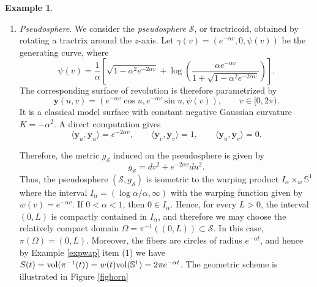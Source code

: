 \documentclass{amsart}
\theoremstyle{definition}
\newtheorem{example}[theorem]{Example}
\theoremstyle{remark}
\numberwithin{equation}{section}
\begin{document}
\begin{example}
\begin{enumerate}
\begin{equation*}\label{boundedspec}
 \begin{aligned}
  \sum_{k=1}^{\infty}\frac{1}{\lambda_k^{\mathcal{D}}(\mathcal{C})} =& \left( \int_{-L}^L\frac{dt}{S(t)} \right)^{-1} \int_{-L}^L 
 S(x)\left(\int_{-L}^x\frac{dt}{S(t)}\int_x^L\frac{dt}{S(t)}\right)dx \\
 =& a^2 \left[ \frac{1}{3}\theta^2(L) +\frac{1}{4}\cosh{\left( 2 \theta(L) \right)} -\frac{1}{8\theta(L)}\sinh{\left( 2\theta(L) \right)}  \right].
 \end{aligned}
\end{equation*}
   

\item \emph{Pseudosphere}. We consider the \emph{pseudosphere} $\mathcal{S}$, or tractricoid, obtained by rotating a
tractrix around the $z$-axis. Let $\gamma(v) = \left( e^{-\alpha v},0,\psi(v) \right)$ be the generating curve, where
\[
\psi(v) = \frac{1}{\alpha} \left[ \sqrt{ 1- \alpha^2 e^{-2\alpha v}}
+ \log \left( \frac{\alpha e^{-\alpha v}}{1+\sqrt{1-\alpha^2 e^{-2\alpha v}}}\right) \right].
\]
The corresponding surface of revolution is therefore parametrized by
\[
\mathbf{y}(u,v)
= \left( e^{-\alpha v}\cos u, e^{-\alpha v}\sin u, \psi(v) \right),
\qquad v\in[0,2\pi).
\]
It is a classical model surface with constant negative Gaussian curvature  \(K=-\alpha^2\). A direct computation gives
\[
\langle \mathbf{y}_u, \mathbf{y}_u \rangle = e^{-2\alpha v}, \qquad \langle \mathbf{y}_v, \mathbf{y}_v \rangle = 1, \qquad \langle \mathbf{y}_u, \mathbf{y}_v \rangle = 0.
\]

Therefore, the metric $g_\mathcal{S}$ induced on the pseudosphere is given by
\begin{equation*}
g_\mathcal{S} = dv^2 + e^{-2\alpha v}du^2. 
\end{equation*}
Thus, the pseudosphere $(\mathcal{S},g_\mathcal{S})$ is isometric to the warping product $I_\alpha \times_{w} \mathbb{S}^1$ where the interval $I_\alpha = (\log \alpha/\alpha, \infty)$ with the warping function given by $w(v) = e^{-\alpha v}$. If $0<\alpha<1$, then $0\in I_\alpha$. Hence, for every $L>0$, the interval $(0,L)$ is compactly contained in $I_\alpha$, and therefore we may choose the relatively compact domain $\Omega=\pi^{-1}((0,L))\subset \mathcal S$. In this case, $\pi(\Omega)=(0,L)$. Moreover, the fibers are circles of radius $e^{-\alpha t}$, and hence by Example \ref{expwap} item (1) we have $S(t)= {\rm vol}(\pi^{-1}(t))=w(t){\rm vol}(\mathbb{S}^1) = 2\pi e^{-\alpha t}$. The geometric scheme is illustrated in Figure \ref{fighorn}
\begin{figure}[htb!]
 \hfill
 \def\r{7}
	\begin{tikzpicture}[scale=0.6,>=stealth]
		

\end{tikzpicture}
\end{figure}
\end{enumerate}
\end{example}
\end{document}
